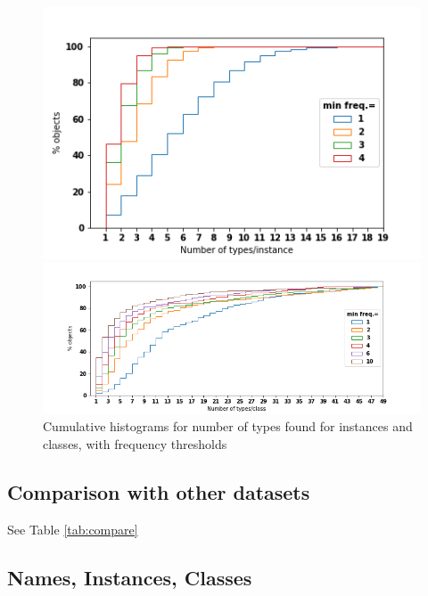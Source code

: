 \begin{figure}
\begin{minipage}[b]{0.4\linewidth}
\includegraphics[scale=.4]{figures/types_instances.png}
\end{minipage}
\begin{minipage}[b]{0.6\linewidth}
\includegraphics[scale=.4]{figures/types_classes.png}
\end{minipage}
\vspace{-0.8cm}
 \caption{\label{fig:ntypes} Cumulative histograms for number of types found for instances and classes, with frequency thresholds}
 
 
\end{figure}




\subsection{Comparison with other datasets}
\label{subsec:compare}

See Table \ref{tab:compare}

\subsection{Names, Instances, Classes}
\label{subsec:counts}

